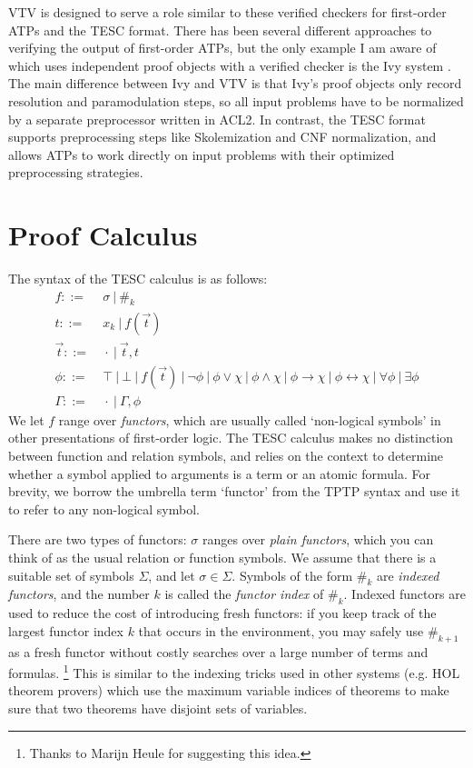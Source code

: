 \documentclass{lipics-v2021}
\newcommand{\idf}[1]{\#_{#1}}
\begin{document}
VTV is designed to serve a role similar to these verified checkers for 
first-order ATPs and the TESC format. There has been several different 
approaches \cite{sutcliffe2006semantic, chihani2015proof} to verifying 
the output of first-order ATPs, but the only example I am aware of
which uses independent proof objects with a verified checker is the 
Ivy system \cite{mccune2000ivy}. The main difference between Ivy and 
VTV is that Ivy's proof objects only record resolution and paramodulation 
steps, so all input problems have to be normalized by a separate 
preprocessor written in ACL2. In contrast, the TESC format supports 
preprocessing steps like Skolemization and CNF normalization, and 
allows ATPs to work directly on input problems with their optimized 
preprocessing strategies.



\section{Proof Calculus} \label{sec:proof-calc} 

The syntax of the TESC calculus is as follows:
\begin{align*}
f ::= &\ \sigma\ |\ \idf{k}\\
t ::= &\ x_k\ |\ f(\vec{t})\\
\vec{t} ::= &\ \cdot\ |\ \vec{t}, t\\
\phi ::= &\ \top\ |\ \bot\ |\ f(\vec{t})\ |\ \lnot \phi\ |\ \phi \lor \chi\ |\ \phi \land \chi\ |\ \phi \to \chi\ |\ \phi \leftrightarrow \chi\ |\ \forall \phi\ |\ \exists \phi\\
\Gamma ::= &\ \cdot\ |\ \Gamma, \phi
\end{align*}
We let $f$ range over \textit{functors}, which are usually called `non-logical symbols' in
other presentations of first-order logic. The TESC calculus makes no distinction
between function and relation symbols, and relies on the context to determine whether 
a symbol applied to arguments is a term or an atomic formula. For brevity, we borrow
the umbrella term `functor' from the TPTP syntax and use it to refer to any non-logical symbol.

There are two types of functors: $\sigma$ ranges over \textit{plain functors}, 
which you can think of as the usual relation or function symbols. We assume that there 
is a suitable set of symbols $\Sigma$, and let $\sigma \in \Sigma$.
Symbols of the form $\idf{k}$ are \textit{indexed functors}, and the number $k$ is 
called the \textit{functor index} of $\idf{k}$. Indexed functors are used to reduce 
the cost of introducing fresh functors: if you keep track of the largest functor index
$k$ that occurs in the environment, you may safely use $\idf{k+1}$ as a fresh functor
without costly searches over a large number of terms and formulas. \footnote{Thanks to Marijn Heule for suggesting this idea.}
This is similar to the indexing tricks used in other systems (e.g. HOL theorem provers)
which use the maximum variable indices of theorems to make sure that two theorems 
have disjoint sets of variables.
\end{document}
